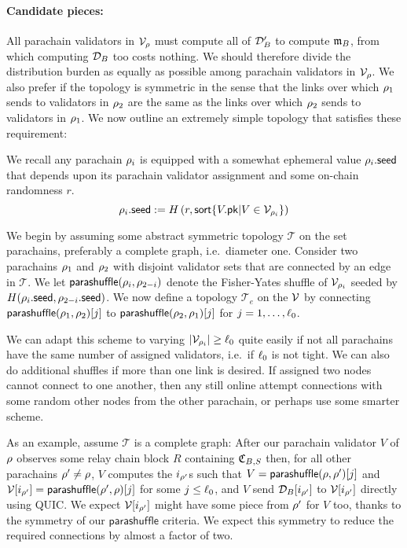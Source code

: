 \smallskip
\paragraph{Candidate pieces:}

All parachain validators in $\mathcal{V}_{\rho}$ must compute all of $\mathcal{D}'_B$ to compute $\mathfrak{m}_B$, from which computing $\mathcal{D}_B$ too costs nothing.  We should therefore divide the distribution burden as equally as possible among parachain validators in $\mathcal{V}_{\rho}$.  We also prefer if the topology is symmetric in the sense that the links over which $\rho_1$ sends to validators in $\rho_2$ are the same as the links over which $\rho_2$ sends to validators in $\rho_1$.  We now outline an extremely simple topology that satisfies these requirement:

We recall any parachain $\rho_i$ is equipped with a somewhat ephemeral value $\rho_i.\mathsf{seed}$ that depends upon its parachain validator assignment and some on-chain randomness $r$.
$$ \rho_i.\mathsf{seed} := H\left( r, \mathsf{sort} \{  V.\mathsf{pk}  |  V \in \mathcal{V}_{\rho_i}  \} \right) $$

We begin by assuming some abstract symmetric topology $\mathcal{T}$ on the set parachains, preferably a complete graph, i.e.\ diameter one.  Consider two parachains $\rho_1$ and $\rho_2$ with disjoint validator sets that are connected by an edge in $\mathcal{T}$.  We let $\mathsf{parashuffle}(\rho_i,\rho_{2-i})$ denote the Fisher-Yates shuffle of $\mathcal{V}_{\rho_i}$ seeded by $H( \rho_i.\mathsf{seed}, \rho_{2-i}.\mathsf{seed} )$.  We now define a topology $\mathcal{T}_e$ on the $\mathcal{V}$ by connecting $\mathsf{parashuffle}(\rho_1,\rho_2)[j]$ to $\mathsf{parashuffle}(\rho_2,\rho_1)[j]$ for $j = 1,\ldots,\ell_0$.

We can adapt this scheme to varying $|\mathcal{V}_{\rho_i}| \ge \ell_0$ quite easily if not all parachains have the same number of assigned validators, i.e.\ if $\ell_0$ is not tight.  We can also do additional shuffles if more than one link is desired.  
% 
If assigned two nodes cannot connect to one another, then any still online attempt connections with some random other nodes from the other parachain, or perhaps use some smarter scheme. 

As an example, assume $\mathcal{T}$ is a complete graph:  After our parachain validator $V$ of $\rho$ observes some relay chain block $R$ containing $\mathfrak{C}_{B,S}$ then, for all other parachains $\rho' \ne \rho$, $V$ computes the $i_{\rho'}$s such that $V = \mathsf{parashuffle}(\rho,\rho')[j]$ and $\mathcal{V}[i_{\rho'}] = \mathsf{parashuffle}(\rho',\rho)[j]$ for some $j \leq \ell_0$, and $V$ send $\mathcal{D}_B[i_{\rho'}]$ to $\mathcal{V}[i_{\rho'}]$ directly using QUIC.  We expect $\mathcal{V}[i_{\rho'}]$ might have some piece from $\rho'$ for $V$ too, thanks to the symmetry of our $\mathsf{parashuffle}$ criteria.  We expect this symmetry to reduce the required connections by almost a factor of two.

